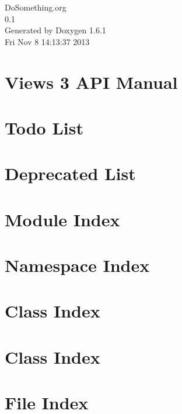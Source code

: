 \documentclass[a4paper]{book}
\begin{document}
\hypersetup{pageanchor=false}
\begin{titlepage}
\vspace*{7cm}
\begin{center}
{\Large DoSomething.org \\[1ex]\large 0.1 }\\
\vspace*{1cm}
{\large Generated by Doxygen 1.6.1}\\
\vspace*{0.5cm}
{\small Fri Nov 8 14:13:37 2013}\\
\end{center}
\end{titlepage}
\clearemptydoublepage
{}
\tableofcontents
\clearemptydoublepage
{}
\hypersetup{pageanchor=true}
\chapter{Views 3 API Manual}
\label{index}\hypertarget{index}{}
\chapter{Todo List}
\label{todo}
\hypertarget{todo}{}

\chapter{Deprecated List}
\label{deprecated}
\hypertarget{deprecated}{}

\chapter{Module Index}

\chapter{Namespace Index}

\chapter{Class Index}

\chapter{Class Index}

\chapter{File Index}

\end{document}
